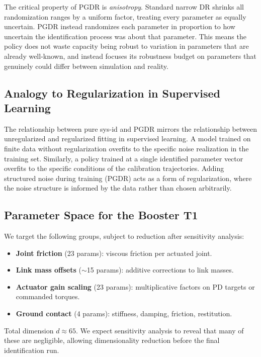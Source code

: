 \documentclass[10pt,twocolumn]{article}
\begin{document}
The critical property of PGDR is \emph{anisotropy}.
Standard narrow DR shrinks all randomization ranges by a uniform factor, treating every parameter as equally uncertain.
PGDR instead randomizes each parameter in proportion to how uncertain the identification process was about that parameter.
This means the policy does not waste capacity being robust to variation in parameters that are already well-known, and instead focuses its robustness budget on parameters that genuinely could differ between simulation and reality.

\subsection{Analogy to Regularization in Supervised Learning}

The relationship between pure sys-id and PGDR mirrors the relationship between unregularized and regularized fitting in supervised learning.
A model trained on finite data without regularization overfits to the specific noise realization in the training set.
Similarly, a policy trained at a single identified parameter vector overfits to the specific conditions of the calibration trajectories.
Adding structured noise during training (PGDR) acts as a form of regularization, where the noise structure is informed by the data rather than chosen arbitrarily.

\subsection{Parameter Space for the Booster T1}

We target the following groups, subject to reduction after sensitivity analysis:
\begin{itemize}
    \item \textbf{Joint friction} (23 params): viscous friction per actuated joint.
    \item \textbf{Link mass offsets} ($\sim$15 params): additive corrections to link masses.
    \item \textbf{Actuator gain scaling} (23 params): multiplicative factors on PD targets or commanded torques.
    \item \textbf{Ground contact} (4 params): stiffness, damping, friction, restitution.
\end{itemize}
Total dimension $d \approx 65$.
We expect sensitivity analysis to reveal that many of these are negligible, allowing dimensionality reduction before the final identification run.
\end{document}
